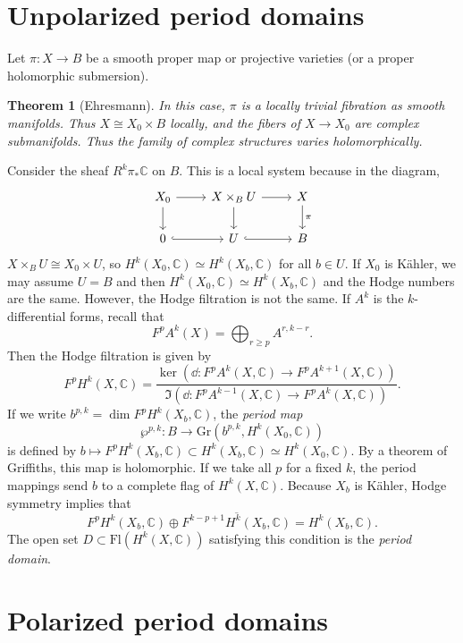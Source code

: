 \documentclass[leqno, openany]{memoir}
\newtheorem{thm}{Theorem}[section]
\theoremstyle{definition}
\theoremstyle{remark}
\theoremstyle{plain}
\theoremstyle{definition}
\theoremstyle{remark}
\newcommand{\C}{\mathbb{C}}
\newcommand{\mr}[1]{\mathrm{#1}}
\newcommand{\ol}[1]{\overline{#1}}
\begin{document}
\section{Unpolarized period domains}%
\label{sec:unpolarized_period_domains}

Let $\pi \colon X \to B$ be a smooth proper map or projective varieties (or a proper holomorphic submersion).
\begin{thm}[Ehresmann]
    In this case, $\pi$ is a locally trivial fibration as smooth manifolds. Thus $X \cong X_0 \times B$ locally, and the fibers of $X \to X_0$ are complex submanifolds. Thus the family of complex structures varies holomorphically.
\end{thm}

Consider the sheaf $R^k \pi_* \C$ on $B$. This is a local system because in the diagram,
\begin{equation*}
\begin{tikzcd}
    X_0 \ar{r} \ar{d} & X \times_B U \ar{d} \ar{r} & X \ar{d}{\pi} \\
    0 \ar[hookrightarrow]{r} & U \ar[hookrightarrow]{r} & B
\end{tikzcd}
\end{equation*}
$X \times_B U \cong X_0 \times U$, so $H^k(X_0, \C) \simeq H^k(X_b, \C)$ for all $b \in U$. If $X_0$ is K\"ahler, we may assume $U = B$ and then $H^k(X_0, \C) \simeq H^k(X_b, \C)$ and the Hodge numbers are the same. However, the Hodge filtration is not the same. If $A^k$ is the $k$-differential forms, recall that
\[ F^p A^k(X) = \bigoplus_{r \geq p} A^{r, k-r}. \]
Then the Hodge filtration is given by
\[ F^p H^k(X, \C) = \frac{\ker(\dd \colon F^p A^k(X, \C) \to F^p A^{k+1}(X, \C))}{\Im(\dd \colon F^p A^{k-1}(X, \C) \to F^p A^k(X, \C))}. \]
If we write $b^{p,k} = \dim F^p H^k(X_b, \C)$, the \textit{period map}
\[ \wp^{p,k} \colon B \to \mr{Gr}(b^{p,k}, H^k(X_0, \C)) \]
is defined by $b \mapsto F^p H^k(X_b, \C) \subset H^k(X_b, \C) \simeq H^k(X_0, \C)$. By a theorem of Griffiths, this map is holomorphic. If we take all $p$ for a fixed $k$, the period mappings send $b$ to a complete flag of $H^k(X, \C)$. Because $X_b$ is K\"ahler, Hodge symmetry implies that
\[ F^p H^k(X_b, \C) \oplus \ol{F^{k-p+1} H^k(X_b, \C)} = H^k(X_b, \C). \]
The open set $D \subset \mr{Fl}(H^k(X, \C))$ satisfying this condition is the \textit{period domain}.

\section{Polarized period domains}%
\label{sec:polarized_period_domains}
\end{document}
